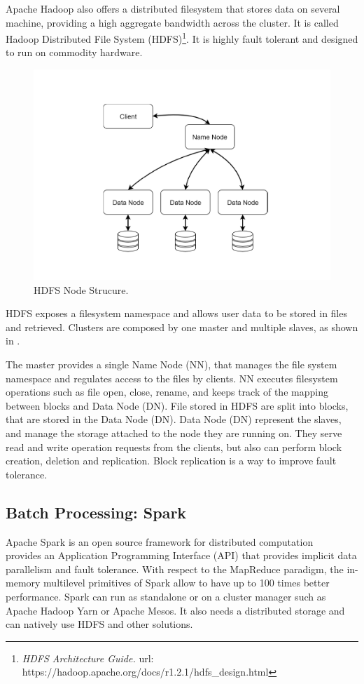 Apache Hadoop also offers a distributed filesystem that stores data on several machine, providing a high aggregate bandwidth across the cluster. It is called Hadoop Distributed File System (HDFS)\footnote{\textit{HDFS Architecture Guide.} url:  https://hadoop.apache.org/docs/r1.2.1/hdfs\_design.html}. 
It is highly fault tolerant and designed to run on commodity hardware.
\begin{figure}
	\vspace{-1.5cm}
	\centering
	\includegraphics[width=\columnwidth]{Images/hdfs_1.pdf}  
	\vspace{-1cm}
	\caption[HDFS Node Strucure]{HDFS Node Strucure.}
	\label{fig:hdfsNodeStruct}
\end{figure}
HDFS exposes a filesystem namespace and allows user data to be stored in files and retrieved. Clusters are composed by one master and multiple slaves, as shown in .

The master provides a single Name Node (NN), that manages
the file system namespace and regulates access to the files by clients.
NN executes filesystem operations such as file open, close, rename, 
and keeps track of the mapping between blocks and Data Node (DN). 
File stored in HDFS are split into blocks, that are stored in the Data Node (DN). Data Node (DN) represent the slaves, and manage the storage attached to the node they are running on. They serve read and write operation requests from the clients, but also can perform block creation, deletion and replication. Block replication is a way to improve fault tolerance.

\subsection{Batch Processing: Spark}\label{sec:spark}
Apache Spark is an open source framework for distributed computation 
~\cite{misc:ApacheSpark} provides an Application Programming Interface (API) that provides implicit data parallelism and fault tolerance. With respect to the MapReduce paradigm, the in-memory multilevel primitives of Spark allow to have up to 100 times better performance. Spark can run as standalone or on a cluster manager such as Apache Hadoop Yarn or Apache Mesos. It also needs a distributed storage and can natively use HDFS and other solutions. 

